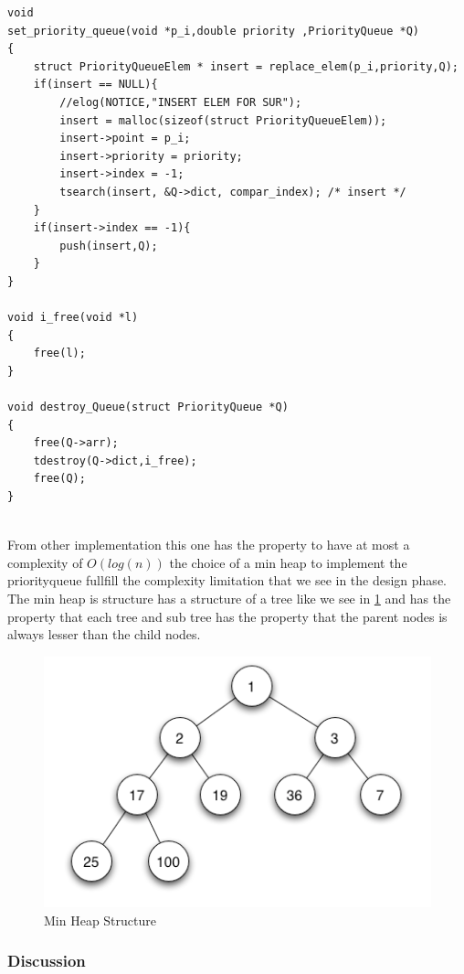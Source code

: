\documentclass[twoside,12pt, a4paper]{report}
\begin{document}
\begin{lstlisting}
void
set_priority_queue(void *p_i,double priority ,PriorityQueue *Q)
{
	struct PriorityQueueElem * insert = replace_elem(p_i,priority,Q);
	if(insert == NULL){
		//elog(NOTICE,"INSERT ELEM FOR SUR");
		insert = malloc(sizeof(struct PriorityQueueElem));
		insert->point = p_i;
		insert->priority = priority;
		insert->index = -1;
		tsearch(insert, &Q->dict, compar_index); /* insert */
	}
	if(insert->index == -1){
		push(insert,Q);
	}
}

void i_free(void *l)
{
	free(l);
}

void destroy_Queue(struct PriorityQueue *Q)
{
	free(Q->arr);
	tdestroy(Q->dict,i_free);
	free(Q);
}
	
\end{lstlisting}

From other implementation this one has the property to have at most a complexity of $O(log(n))$ the choice of a min heap to implement the priorityqueue fullfill the complexity limitation that we see in the design phase. The min heap is structure has a structure of a tree like we see in \ref{fig:min_heap} and has the property that each tree and sub tree has the property that the parent nodes is always lesser than the child nodes.



\begin{figure}[!h]
	\centering
	\includegraphics[width=1\linewidth]{figures/tree.png}
	\caption{Min Heap Structure}
	\label{fig:min_heap}
\end{figure}


\subsubsection{Discussion}
\end{document}

